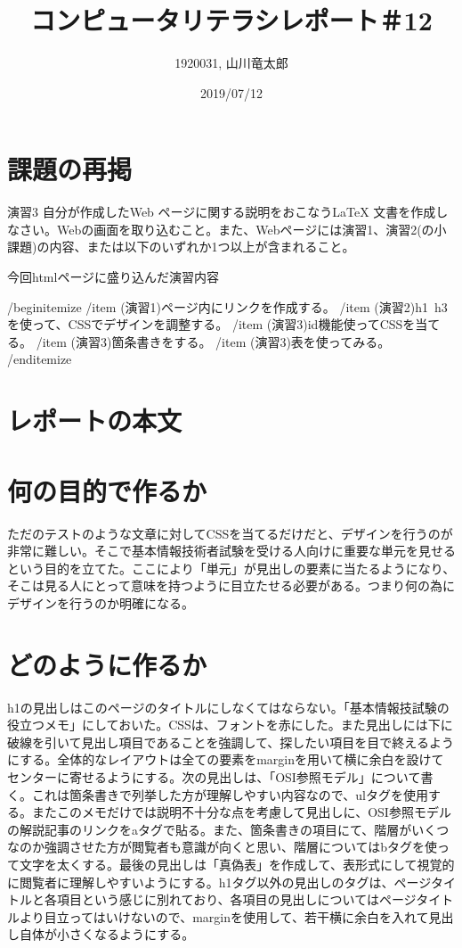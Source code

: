 \documentclass[12pt,a4j]{jarticle}
\begin{document}
\title{コンピュータリテラシレポート＃12}
\author{1920031, 山川竜太郎}
\date{2019/07/12}
\maketitle


\section{課題の再掲}
演習3 自分が作成したWeb ページに関する説明をおこなうLaTeX 文書を作成しなさい。Webの画面を取り込むこと。また、Webページには演習1、演習2(の小課題)の内容、または以下のいずれか1つ以上が含まれること。

今回htmlページに盛り込んだ演習内容

/begin{itemize}
  /item (演習1)ページ内にリンクを作成する。
  /item (演習2)h1~h3を使って、CSSでデザインを調整する。
  /item (演習3)id機能使ってCSSを当てる。
  /item (演習3)箇条書きをする。
  /item (演習3)表を使ってみる。
/end{itemize}

\section{レポートの本文}

\section{何の目的で作るか}

ただのテストのような文章に対してCSSを当てるだけだと、デザインを行うのが非常に難しい。そこで基本情報技術者試験を受ける人向けに重要な単元を見せるという目的を立てた。ここにより「単元」が見出しの要素に当たるようになり、そこは見る人にとって意味を持つように目立たせる必要がある。つまり何の為にデザインを行うのか明確になる。

\section{どのように作るか}

h1の見出しはこのページのタイトルにしなくてはならない。「基本情報技試験の役立つメモ」にしておいた。CSSは、フォントを赤にした。また見出しには下に破線を引いて見出し項目であることを強調して、探したい項目を目で終えるようにする。全体的なレイアウトは全ての要素をmarginを用いて横に余白を設けてセンターに寄せるようにする。次の見出しは、「OSI参照モデル」について書く。これは箇条書きで列挙した方が理解しやすい内容なので、ulタグを使用する。またこのメモだけでは説明不十分な点を考慮して見出しに、OSI参照モデルの解説記事のリンクをaタグで貼る。また、箇条書きの項目にて、階層がいくつなのか強調させた方が閲覧者も意識が向くと思い、階層についてはbタグを使って文字を太くする。最後の見出しは「真偽表」を作成して、表形式にして視覚的に閲覧者に理解しやすいようにする。h1タグ以外の見出しのタグは、ページタイトルと各項目という感じに別れており、各項目の見出しについてはページタイトルより目立ってはいけないので、marginを使用して、若干横に余白を入れて見出し自体が小さくなるようにする。
\end{document}
